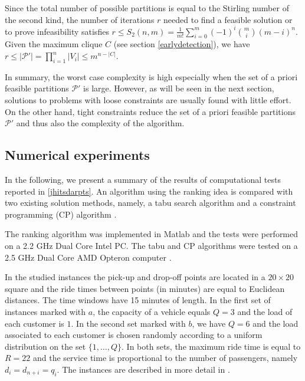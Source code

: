 \documentclass[dissertation,draft*]{aaltoseries}
\begin{document}
Since the total number of possible partitions is 
equal to the Stirling number of the second kind, the number of iterations $r$ needed to find a feasible solution
or to prove infeasibility satisfies $r \leq S_2(n,m) = \frac {1}{m!} \sum_{i=0}^{m} (-1)^i {m \choose i} (m-i)^n$.
Given the maximum clique $C$ (see section \ref{earlydetection}), we have $r \leq |\mathcal{P}'| = \prod_{i=1}^n |V_i| \leq m^{n-|C|}$.

In summary, the worst case complexity is high especially when the set of a priori feasible partitions $\mathcal{P}'$ is large. 
However, as will be seen in the next section, solutions to problems with loose constraints are usually found with little effort. 
On the other hand, tight constraints reduce the set of a priori feasible partitions $\mathcal{P}'$ 
and thus also the complexity of the algorithm.


\subsection{Numerical experiments}
\label{mvexperience}
In the following, we present a summary of the results of computational tests reported in \ref{jhitsdarpts}.
An algorithm using the ranking idea is compared with two existing solution methods,
namely, a tabu search algorithm \citep{cordeau02} and
a constraint programming (CP) algorithm \citep{berbegliafeas}. 

The ranking algorithm was implemented in Matlab and the tests were performed on a 2.2 GHz Dual Core Intel PC. 
The tabu and CP algorithms were tested on a 2.5 GHz Dual Core AMD Opteron computer \citep{berbegliathesis}. 

In the studied instances the pick-up and drop-off points are located in a $20 \times 20$ square and the 
ride times between points (in minutes) are equal to Euclidean distances. The time windows
have 15 minutes of length. In the first set of instances marked with $a$, the capacity of a vehicle equals $Q=3$ and 
the load of each customer is $1$. In the 
second set marked with $b$, we have $Q=6$ and the load associated to each customer
is chosen randomly according to a uniform distribution on the set $\{1, \ldots,Q\}$.
In both sets, the maximum ride time is equal to $R=22$ and the service time is 
proportional to the number of passengers, namely $d_i = d_{n+i} = q_i$.
The instances are described in more detail in \citep{cordeau01,ropke2007,berbegliafeas}.
\end{document}
